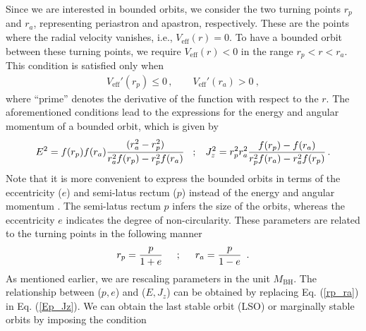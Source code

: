 \documentclass[11pt]{article}
\begin{document}
Since we are interested in bounded orbits, we consider the two turning points $r_{p}$ and $r_{a}$, representing periastron and apastron, respectively. These are the points where the radial velocity vanishes, i.e., $V_{\textrm{eff}}(r) = 0$. To have a bounded orbit between these turning points, we require $V_{\textrm{eff}}(r)<0$ in the range $r_p<r<r_a$. This condition is satisfied only when \cite{PhysRevD.103.104045}
\begin{equation}
    \begin{aligned}
        V_{\textrm{eff}}'(r_p)\leq 0\,,\qquad  V_{\textrm{eff}}'(r_a)>0~,
    \end{aligned}
\end{equation}
where ``prime'' denotes the derivative of the function with respect to the $r$. The aforementioned conditions lead to the expressions for the energy and angular momentum of a bounded orbit, which is given by
\begin{equation}\label{Ep_Jz}
  \begin{aligned}
    E^{2} = f(r_{p}) f(r_{a}) \frac{(r_{a}^{2}-r_{p}^{2})}{r_{a}^{2}f(r_{p})-r_{p}^{2}f(r_{a})} \hspace{3mm} ; \hspace{3mm} J_{z}^{2} = r_{p}^{2} r_{a}^{2} \frac{f(r_{p})-f(r_{a})}{r_{p}^{2}f(r_{a})-r_{a}^{2}f(r_{p})}\,.
\end{aligned}  
\end{equation}
Note that it is more convenient to express the bounded orbits in terms of the eccentricity ($e$) and semi-latus rectum ($p$) instead of the energy and angular momentum \cite{PhysRevD.50.3816}. The semi-latus rectum $p$ infers the size of the orbits, whereas the eccentricity $e$ indicates the degree of non-circularity. These parameters are related to the turning points in the following manner
\begin{align}\label{rp_ra}
    r_{p} = \frac{p}{1+e} \hspace{5mm} ; \hspace{5mm} r_{a} = \frac{p}{1-e}~\,.
\end{align}
As mentioned earlier, we are rescaling parameters in the unit $M_{\textrm{BH}}$. The relationship between ($p, e$) and ($E, J_{z}$) can be obtained by replacing Eq. (\ref{rp_ra}) in Eq. (\ref{Ep_Jz}). We can obtain the last stable orbit (LSO) or marginally stable orbits by imposing the condition \cite{PhysRevD.103.104045, PhysRevD.77.124050}
\end{document}
